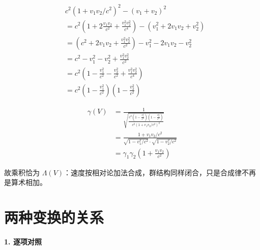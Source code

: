\documentclass[
  chinese,
  a4paper,
  UTF8,
  12pt,
  oneside,
  openany]{ctexbook}
\theoremstyle{plain}
\theoremstyle{plain}
\theoremstyle{plain}
\theoremstyle{definition}
\theoremstyle{plain}
\theoremstyle{plain}
\theoremstyle{remark}
\begin{document}
\[
\begin{aligned}
&c^2(1 + v_1v_2/c^2)^2 - (v_1 + v_2)^2 \\
&= c^2 \left( 1 + 2\frac{v_1v_2}{c^2} + \frac{v_1^2v_2^2}{c^4} \right) - (v_1^2 + 2v_1v_2 + v_2^2) \\
&= \left( c^2 + 2v_1v_2 + \frac{v_1^2v_2^2}{c^2} \right) - v_1^2 - 2v_1v_2 - v_2^2 \\
&= c^2 - v_1^2 - v_2^2 + \frac{v_1^2v_2^2}{c^2} \\
&= c^2 \left( 1 - \frac{v_1^2}{c^2} - \frac{v_2^2}{c^2} + \frac{v_1^2v_2^2}{c^4} \right) \\
&= c^2 \left( 1 - \frac{v_1^2}{c^2} \right) \left( 1 - \frac{v_2^2}{c^2} \right)
\end{aligned}
\]

\[
\begin{aligned}
\gamma(V) &= \frac{1}{\sqrt{\frac{c^2 \left( 1 - \frac{v_1^2}{c^2} \right) \left( 1 - \frac{v_2^2}{c^2} \right)}{c^2(1 + v_1v_2/c^2)^2}}} \\
&= \frac{1 + v_1v_2/c^2}{\sqrt{1 - v_1^2/c^2} \cdot \sqrt{1 - v_2^2/c^2}} \\
&= \gamma_1 \gamma_2 \left( 1 + \frac{v_1v_2}{c^2} \right)
\end{aligned}
\]

故乘积恰为
\(\Lambda(V)\)：速度按相对论加法合成，群结构同样闭合，只是合成律不再是算术相加。

\section{两种变换的关系}\label{ux4e24ux79cdux53d8ux6362ux7684ux5173ux7cfb}

\textbf{1. 逐项对照}
\end{document}
